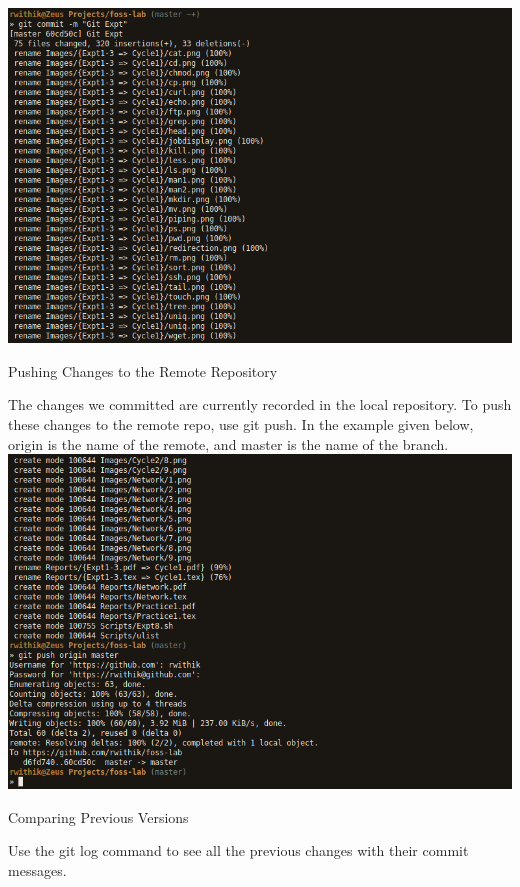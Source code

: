 \documentclass[10pt,a4paper,titlepage]{report}
\begin{document}
\includegraphics[scale=.45]{../Images/VCS/4.png}
\pagebreak
\begin{center}
\Large{Pushing Changes to the Remote Repository}
\end{center}
\vspace{.5cm}
\par The changes we committed are currently recorded in the local repository. To push these changes to the remote repo, use {\color{red} git push}. In the example given below, origin is the name of the remote, and master is the name of the branch. \newline\newline
\includegraphics[scale=.45]{../Images/VCS/5.png}
\pagebreak
\begin{center}
\Large{Comparing Previous Versions}
\end{center}
\vspace{.5cm}
\par Use the {\color{red} git log} command to see all the previous changes with their commit messages. \newline\newline
\end{document}
